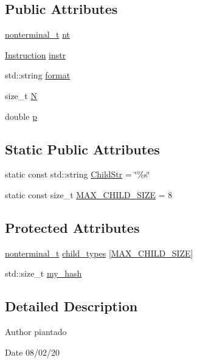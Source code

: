 \subsection*{Public Attributes}
\begin{DoxyCompactItemize}
\item 
\hyperlink{_nonterminal_8h_a5c1f658dc7560600a16d22408bd716ca}{nonterminal\+\_\+t} \hyperlink{class_rule_a980385e76137909454bd6a585bd2e138}{nt}
\item 
\hyperlink{class_instruction}{Instruction} \hyperlink{class_rule_a367e578f5e1427ef04d1d77477565c67}{instr}
\item 
std\+::string \hyperlink{class_rule_aa48c15aaaf5242afea0439607f2a2177}{format}
\item 
size\+\_\+t \hyperlink{class_rule_a0a2a742af39b60831ad1ac5eb5ba7498}{N}
\item 
double \hyperlink{class_rule_acd7e4d41d59dec76f60ca16238ab391a}{p}
\end{DoxyCompactItemize}
\subsection*{Static Public Attributes}
\begin{DoxyCompactItemize}
\item 
static const std\+::string \hyperlink{class_rule_a3ffb425ebd6c508ca47234e3800f769c}{Child\+Str} = \char`\"{}\%s\char`\"{}
\item 
static const size\+\_\+t \hyperlink{class_rule_ac78a2201dfba27f803111205396f0027}{M\+A\+X\+\_\+\+C\+H\+I\+L\+D\+\_\+\+S\+I\+ZE} = 8
\end{DoxyCompactItemize}
\subsection*{Protected Attributes}
\begin{DoxyCompactItemize}
\item 
\hyperlink{_nonterminal_8h_a5c1f658dc7560600a16d22408bd716ca}{nonterminal\+\_\+t} \hyperlink{class_rule_ac29b59e23c3327fed7a1e99b06512057}{child\+\_\+types} \mbox{[}\hyperlink{class_rule_ac78a2201dfba27f803111205396f0027}{M\+A\+X\+\_\+\+C\+H\+I\+L\+D\+\_\+\+S\+I\+ZE}\mbox{]}
\item 
std\+::size\+\_\+t \hyperlink{class_rule_af2d873c97e2de425f14a5a980dbcc104}{my\+\_\+hash}
\end{DoxyCompactItemize}


\subsection{Detailed Description}
\begin{DoxyAuthor}{Author}
piantado 
\end{DoxyAuthor}
\begin{DoxyDate}{Date}
08/02/20 
\end{DoxyDate}



